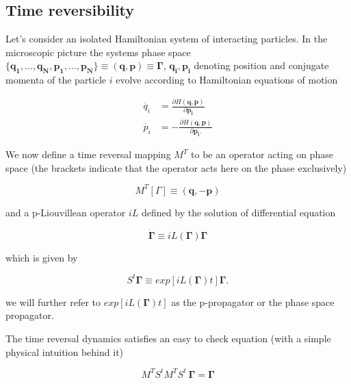 \documentclass[a4paper,12pt,nofootinbib]{article}
\begin{document}
\subsection{Time reversibility}
Let's consider an isolated Hamiltonian system of interacting particles.
In the microscopic picture the systems phase space $\{\bm{q_1},...,\bm{q_N},\bm{p_1},...,\bm{p_N} \} \equiv (\bm{q},\bm{p})\equiv \bm{\Gamma} $, $\bm{q_i}, \bm{p_i} $ denoting position and conjugate momenta of the particle $i$ evolve according to Hamiltonian equations of motion

\begin{equation}
\begin{aligned}
  \dot{q_i} &=\frac{\partial H(\bm{q},\bm{p})}{\partial{\bm{p_i}}} \\
  \dot{p_i} &=- \frac{\partial H(\bm{q},\bm{p})}{\partial{\bm{p_i}}.}
\end{aligned}
\end{equation}

We now define a time reversal mapping $M^T$ to be an operator acting on phase space (the brackets indicate that the operator acts here on the phase exclusively) 

\begin{equation}
  M^T[ \Gamma] \equiv (\bm{q},-\bm{p})
\end{equation}

and a p-Liouvillean operator $iL$ defined by the solution of differential equation 

\begin{equation}
 \dot{\bm{\Gamma}} \equiv iL(\bm{\Gamma})\bm{\Gamma}
\end{equation}

which is given by

\begin{equation}
  S^t \bm{\Gamma} \equiv exp[iL(\bm{\Gamma})t]\bm{\Gamma}.
\end{equation}


we will further refer to $ exp[iL(\bm{\Gamma})t] $ as the p-propagator or the phase space propagator.



The time reversal dynamics satisfies an easy to check equation (with a simple physical intuition behind it)

\begin{equation}
  M^T S^t M^T S^t\ \bm{\Gamma} = \bm{\Gamma}
\end{equation}
\end{document}
